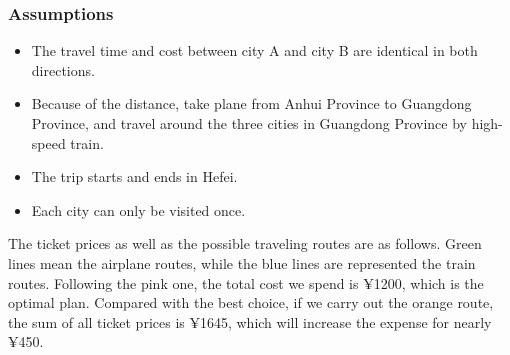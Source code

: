 \documentclass{extarticle}
\begin{document}
\subsubsection{Assumptions}
\begin{itemize}
  \item The travel time and cost between city A and city B are identical in both directions.
  \item Because of the distance, take plane from Anhui Province to Guangdong Province, and travel around the three cities in Guangdong Province by high-speed train.
  \item The trip starts and ends in Hefei.
  \item Each city can only be visited once.
\end{itemize}

The ticket prices as well as the possible traveling routes are as follows. Green lines mean the airplane routes, while the blue lines are represented the train routes.
Following the pink one, the total cost we spend is ¥1200, which is the optimal plan. Compared with the best choice, if we carry out the orange route, the sum of all ticket prices is ¥1645, which will increase the expense for nearly ¥450.
\end{document}
